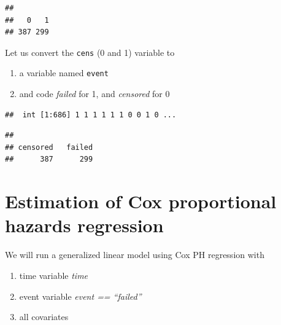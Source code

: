 \documentclass[
]{book}
\makeatletter
\newenvironment{Shaded}{\begin{snugshade}}{\end{snugshade}}
\newcommand{\AttributeTok}[1]{\textcolor[rgb]{0.61,0.61,0.61}{#1}}
\newcommand{\FunctionTok}[1]{\textcolor[rgb]{0,0,0}{#1}}
\newcommand{\NormalTok}[1]{#1}
\newcommand{\OtherTok}[1]{\textcolor[rgb]{0.37,0.37,0.37}{#1}}
\newcommand{\SpecialCharTok}[1]{\textcolor[rgb]{0,0,0}{#1}}
\newcommand{\StringTok}[1]{\textcolor[rgb]{0.5,0.5,0.5}{#1}}
\providecommand{\tightlist}{%
  \setlength{\itemsep}{0pt}\setlength{\parskip}{0pt}}
\newenvironment{kframe}{%
\medskip{}
\setlength{\fboxsep}{.8em}
 \def\at@end@of@kframe{}%
 \ifinner\ifhmode%
  \def\at@end@of@kframe{\end{minipage}}%
  \begin{minipage}{\columnwidth}%
 \fi\fi%
 \def\FrameCommand##1{\hskip\@totalleftmargin \hskip-\fboxsep
 \colorbox{shadecolor}{##1}\hskip-\fboxsep
     \hskip-\linewidth \hskip-\@totalleftmargin \hskip\columnwidth}%
 \MakeFramed {\advance\hsize-\width
   \@totalleftmargin\z@ \linewidth\hsize
   \@setminipage}}%
 {\par\unskip\endMakeFramed%
 \at@end@of@kframe}
\renewenvironment{Shaded}{\begin{kframe}}{\end{kframe}}
\makeatother
\begin{document}
\begin{verbatim}
## 
##   0   1 
## 387 299
\end{verbatim}

Let us convert the \texttt{cens} (0 and 1) variable to

\begin{enumerate}
\def\labelenumi{\arabic{enumi}.}
\tightlist
\item
  a variable named \texttt{event}
\item
  and code \emph{failed} for 1, and \emph{censored} for 0
\end{enumerate}

\begin{Shaded}
\end{Shaded}

\begin{verbatim}
##  int [1:686] 1 1 1 1 1 1 0 0 1 0 ...
\end{verbatim}

\begin{Shaded}
\end{Shaded}

\begin{verbatim}
## 
## censored   failed 
##      387      299
\end{verbatim}

\hypertarget{estimation-of-cox-proportional-hazards-regression}{%
\section{Estimation of Cox proportional hazards regression}\label{estimation-of-cox-proportional-hazards-regression}}

We will run a generalized linear model using Cox PH regression with

\begin{enumerate}
\def\labelenumi{\arabic{enumi}.}
\tightlist
\item
  time variable \emph{time}
\item
  event variable \emph{event == ``failed''}
\item
  all covariates
\end{enumerate}
\end{document}
